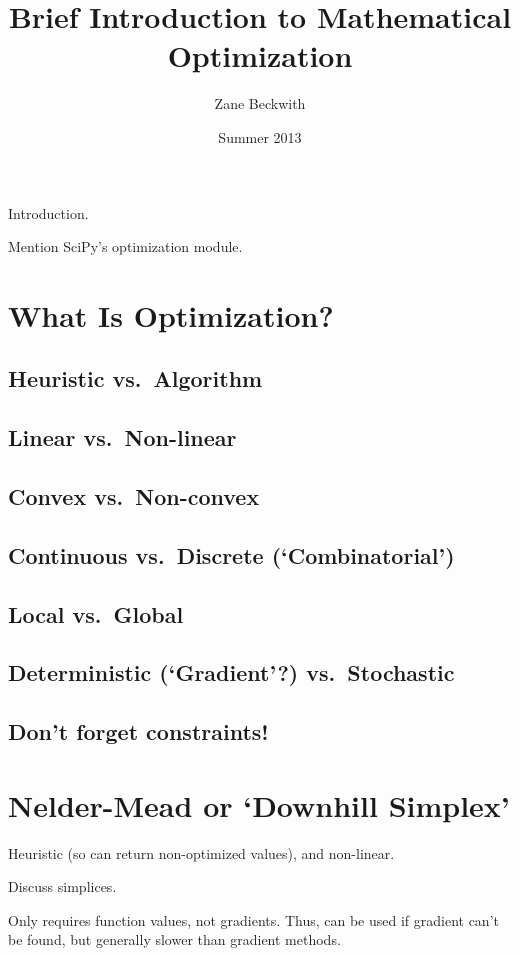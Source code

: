 \documentclass{article}
\begin{document}
\title{Brief Introduction to Mathematical Optimization}
\author{Zane Beckwith}
\date{Summer 2013}
\maketitle

Introduction.

Mention SciPy's optimization module.

\section*{What Is Optimization?}
  \subsection*{Heuristic vs.\ Algorithm}
  \subsection*{Linear vs.\ Non-linear}
  \subsection*{Convex vs.\ Non-convex}
  \subsection*{Continuous vs.\ Discrete (`Combinatorial')}
  \subsection*{Local vs.\ Global}
  \subsection*{Deterministic (`Gradient'?) vs.\ Stochastic}
  \subsection*{Don't forget constraints!}

\section*{Nelder-Mead or `Downhill Simplex'}
  Heuristic (so can return non-optimized values), 
  and non-linear.

  Discuss simplices.

  Only requires function values,
  not gradients. Thus, can be used
  if gradient can't be found, but 
  generally slower than gradient methods.
\end{document}
